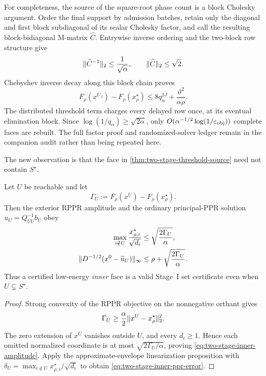 For completeness, the source of the square-root phase count is a block
Cholesky argument.  Order the final support by admission batches, retain only
the diagonal and first block subdiagonal of its scalar Cholesky factor, and
call the resulting block-bidiagonal M-matrix $\widehat C$.  Entrywise inverse
ordering and the two-block row structure give
\begin{equation}
 \lVert\widehat C^{-1}\rVert_2\leq\frac1{\sqrt\alpha},
 \qquad
 \lVert\widehat C\rVert_2\leq\sqrt2.
 \label{eq:two-stage-bidiagonal-conditioning}
\end{equation}
Chebyshev inverse decay along this block chain proves
\begin{equation}
 F_\rho(x^{U_J})-F_\rho(x_\rho^\star)
 \leq 8q_\alpha^{2J}+\frac{\vartheta^2}{\alpha\rho}.
 \label{eq:two-stage-batch-depth-import}
\end{equation}
The distributed threshold term charges every delayed row once, at its
eventual elimination block.  Since
$\log(1/q_\alpha)\geq\sqrt{2\alpha}$, only
$O(\alpha^{-1/2}\log(1/\varepsilon_{\rm obj}))$ complete faces are rebuilt.
The full factor proof and randomized-solver ledger remain in the companion
audit rather than being repeated here.

The new observation is that the face in
\cref{thm:two-stage-threshold-source} need not contain $S^\star$.

\begin{lemma}
\label{lem:two-stage-inner-face-energy}
Let $U$ be reachable and let
\begin{equation}
 \Gamma_U:=F_\rho(x^U)-F_\rho(x_\rho^\star).
 \label{eq:two-stage-inner-face-gap}
\end{equation}
Then the exterior RPPR amplitude and the ordinary principal-PPR solution
$u_U=Q_{UU}^{-1}b_U$ obey
\begin{align}
 \max_{i\notin U}\frac{x_{\rho,i}^\star}{\sqrt{d_i}}
 &\leq\sqrt{\frac{2\Gamma_U}{\alpha}},
 \label{eq:two-stage-inner-amplitude}\\
 \lVert D^{-1/2}(x^0-\widetilde u_U)\rVert_\infty
 &\leq\rho+\sqrt{\frac{2\Gamma_U}{\alpha}}.
 \label{eq:two-stage-inner-ppr-error}
\end{align}
Thus a certified low-energy \emph{inner} face is a valid Stage~I set
certificate even when $U\subsetneq S^\star$.
\end{lemma}

\begin{proof}
Strong convexity of the RPPR objective on the nonnegative orthant gives
\begin{equation*}
 \Gamma_U\geq\frac\alpha2\lVert x^U-x_\rho^\star\rVert_2^2.
\end{equation*}
The zero extension of $x^U$ vanishes outside $U$, and every $d_i\geq1$.
Hence each omitted normalized coordinate is at most
$\sqrt{2\Gamma_U/\alpha}$, proving
\cref{eq:two-stage-inner-amplitude}.  Apply the approximate-envelope
linearization proposition with
$\delta_U=\max_{i\notin U}x_{\rho,i}^\star/\sqrt{d_i}$ to obtain
\cref{eq:two-stage-inner-ppr-error}.
\end{proof}

